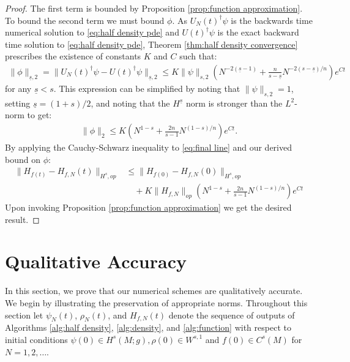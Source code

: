 \documentclass[final,leqno]{siamart}
\begin{document}
\begin{proof}
	The first term is bounded by Proposition \ref{prop:function approximation}.
	To bound the second term we must bound $\phi$.
	As $U_{N}(t)^{\dagger} \psi$ is the backwards time numerical solution to \eqref{eq:half density pde} and $U(t)^{\dagger}\psi$ is the exact backward time solution to \eqref{eq:half density pde},
	Theorem \ref{thm:half density convergence} prescribes the existence of constants $K$ and $C$ such that:
	\begin{align*}
		\| \phi \|_{\underline{s},2} = \| U_{N}(t)^{\dagger} \psi - U(t)^{\dagger} \psi \|_{\underline{s},2}  \leq K \| \psi \|_{s,2} \left(  N^{-2(\underline{s}-1)} + \frac{n}{s - \underline{s}} N^{-2(s-\underline{s})/n} \right) e^{Ct} 
	\end{align*}
	for any $\underline{s} <s$.
	This expression can be simplified by noting that $\| \psi \|_{s,2} = 1$, setting $\underline{s} = (1+s)/2$, and noting that the $H^{\underline{s}}$ norm is stronger than the $L^{2}$-norm to get:
	\begin{align*}
		 \| \phi \|_{2}  \leq  K \left(  N^{1-s} + \frac{2n}{s -1} N^{(1-s)/n} \right) e^{Ct}.
	\end{align*}
	By applying the Cauchy-Schwarz inequality to \eqref{eq:final line} and our derived bound on $\phi$:
	\begin{align*}
		\| H_{f(t)} - H_{f,N}(t) \|_{H^{s},op} &\leq \| H_{f(0)} - H_{f,N}(0) \|_{H^{s},op} \\
			&\quad+  K \| H_{f,N} \|_{op} \left( N^{1-s} + \frac{2n}{s -1} N^{(1-s)/n} \right) e^{Ct}
	\end{align*}
	Upon invoking Proposition \ref{prop:function approximation} we get the desired result.
\end{proof}


\section{Qualitative Accuracy} \label{sec:qualitative}
In this section, we prove that our numerical schemes are qualitatively accurate.
We begin by illustrating the preservation of appropriate norms.
Throughout this section let $\psi_{N}(t)$, $\rho_{N}(t)$, and $H_{f,N}(t)$ denote the sequence of outputs of Algorithms \ref{alg:half density}, \ref{alg:density}, and \ref{alg:function} with respect to initial conditions $\psi(0) \in H^{s}(M;g), \rho(0) \in W^{s,1}$ and $f(0) \in C^{s}(M)$ for $N = 1,2,\dots$.
	
\end{document}
